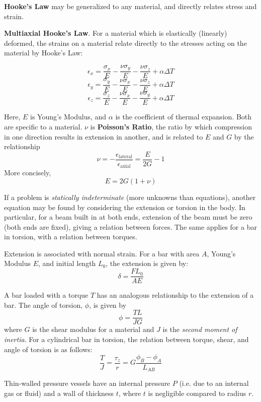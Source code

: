 \textbf{Hooke's Law} may be generalized to any material, and directly relates stress and strain. \begin{shaded}
    \textbf{Multiaxial Hooke's Law}. For a material which is elastically (linearly) deformed, the strains on a material relate directly to the stresses acting on the material by Hooke's Law:

    \[\epsilon_x = \frac{\sigma_x}{E} - \frac{\nu\sigma_y}{E} - \frac{\nu \sigma_z}{E} + \alpha\Delta T\]
    \[\epsilon_y = \frac{\sigma_y}{E} - \frac{\nu\sigma_x}{E} - \frac{\nu \sigma_z}{E} + \alpha\Delta T\]
    \[\epsilon_z = \frac{\sigma_z}{E} - \frac{\nu\sigma_x}{E} - \frac{\nu \sigma_y}{E} + \alpha\Delta T\]

    Here, $E$ is Young's Modulus, and $\alpha$ is the coefficient of thermal expansion. Both are specific to a material. $\nu$ is \textbf{Poisson's Ratio}, the ratio by which compression in one direction results in extension in another, and is related to $E$ and $G$ by the relationship \[\nu = -\frac{\epsilon_\text{lateral}}{\epsilon_\text{axial}} = \frac{E}{2G} - 1\] More concisely, \[E = 2G(1+\nu)\] 
\end{shaded}

If a problem is \textit{statically indeterminate} (more unknowns than equations), another equation may be found by considering the extension or torsion in the body. In particular, for a beam built in at both ends, extension of the beam must be zero (both ends are fixed), giving a relation between forces. The same applies for a bar in torsion, with a relation between torques.

Extension is associated with normal strain. For a bar with area $A$, Young's Modulus $E$, and initial length $L_0$, the extension is given by: \[\delta = \frac{FL_0}{AE}\] 

A bar loaded with a torque $T$ has an analogous relationship to the extension of a bar. The angle of torsion, $\phi$, is given by \[\phi = \frac{TL}{JG}\] where $G$ is the shear modulus for a material and $J$ is the \textit{second moment of inertia}. For a cylindrical bar in torsion, the relation between torque, shear, and angle of torsion is as follows: \[\frac{T}{J} = \frac{\tau_{z}}{r}=G\frac{\phi_B-\phi_A}{L_{AB}}\]

\newpage

Thin-walled pressure vessels have an internal pressure $P$ (i.e. due to an internal gas or fluid) and a wall of thickness $t$, where $t$ is negligible compared to radius $r$.

